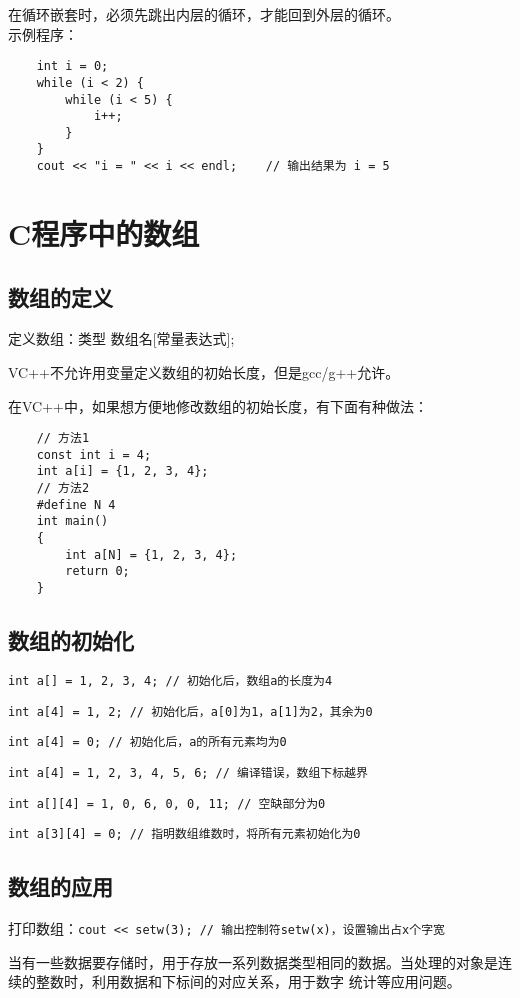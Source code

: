 \documentclass[UTF8]{ctexart}
\begin{document}
在循环嵌套时，必须先跳出内层的循环，才能回到外层的循环。\\
示例程序：
\begin{verbatim}
    int i = 0;
    while (i < 2) {
        while (i < 5) {
            i++;
        }
    }
    cout << "i = " << i << endl;    // 输出结果为 i = 5
\end{verbatim}

\section{C程序中的数组}
\subsection{数组的定义}
定义数组：类型 数组名[常量表达式];

VC++不允许用变量定义数组的初始长度，但是gcc/g++允许。

在VC++中，如果想方便地修改数组的初始长度，有下面有种做法：
\begin{verbatim}
    // 方法1
    const int i = 4;
    int a[i] = {1, 2, 3, 4};
    // 方法2
    #define N 4
    int main()
    {
        int a[N] = {1, 2, 3, 4};
        return 0;
    }
\end{verbatim}

\subsection{数组的初始化}
\texttt{int a[] = {1, 2, 3, 4};        // 初始化后，数组a的长度为4}

\texttt{int a[4] = {1, 2};             // 初始化后，a[0]为1，a[1]为2，其余为0}

\texttt{int a[4] = {0};                // 初始化后，a的所有元素均为0}

\texttt{int a[4] = {1, 2, 3, 4, 5, 6}; // 编译错误，数组下标越界}

\texttt{int a[][4] = {{1}, {0, 6}, {0, 0, 11}};    // 空缺部分为0}

\texttt{int a[3][4] = {0};             // 指明数组维数时，将所有元素初始化为0}

\subsection{数组的应用}
打印数组：\texttt{cout << setw(3);      // 输出控制符setw(x)，设置输出占x个字宽}

当有一些数据要存储时，用于存放一系列数据类型相同的数据。当处理的对象是连续的整数时，利用数据和下标间的对应关系，用于数字
统计等应用问题。
\end{document}
